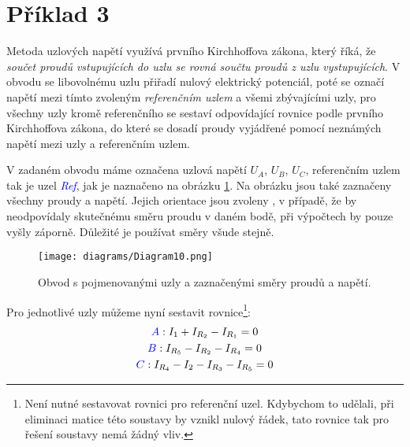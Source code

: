 \section{Příklad 3}

Metoda uzlových napětí využívá prvního Kirchhoffova zákona, který říká, že \textit{součet proudů vstupujících do uzlu se rovná součtu proudů z uzlu vystupujících}. V obvodu se libovolnému uzlu přiřadí nulový elektrický potenciál, poté se  označí napětí mezi tímto zvoleným \textit{referenčním uzlem} a všemi zbývajícími uzly, pro všechny uzly kromě referenčního se sestaví odpovídající rovnice podle prvního Kirchhoffova zákona, do které se dosadí proudy vyjádřené pomocí neznámých napětí mezi uzly a referenčním uzlem.

V zadaném obvodu máme označena uzlová napětí $U_A$, $U_B$, $U_C$, referenčním uzlem tak je uzel \textcolor{blue}{\textit{Ref}}, jak je naznačeno na obrázku \ref{fig:circ-3-1}. Na obrázku jsou také zaznačeny všechny proudy a napětí. Jejich orientace jsou zvoleny , v případě, že by neodpovídaly skutečnému směru proudu v daném bodě, při výpočtech by pouze vyšly záporně. Důležité je používat směry všude stejně.
\begin{figure}[ht]
    \centering
    \texttt{[image: diagrams/Diagram10.png]}
    \caption{Obvod s pojmenovanými uzly a zaznačenými směry proudů a napětí.}
    \label{fig:circ-3-1}
\end{figure}

Pro jednotlivé uzly můžeme nyní sestavit rovnice\footnote{Není nutné sestavovat rovnici pro referenční uzel. Kdybychom to udělali, při eliminaci matice této soustavy by vznikl nulový řádek, tato rovnice tak pro řešení soustavy nemá žádný vliv.}:
\begin{gather*}
    \textcolor{blue}{A}: I_1 + I_{R_2} - I_{R_1} = 0 \\
    \textcolor{blue}{B}: I_{R_5} - I_{R_2} - I_{R_4} = 0 \\
    \textcolor{blue}{C}: I_{R_4} - I_2 - I_{R_3} - I_{R_5} = 0 \\
\end{gather*}

